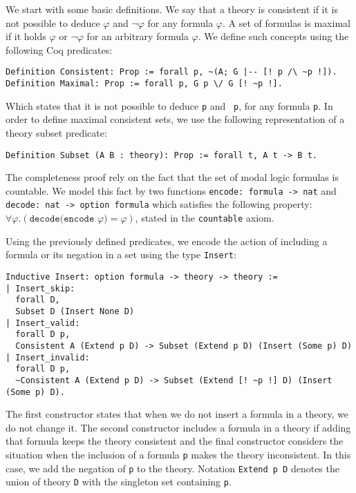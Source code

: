 \documentclass[3p,times]{elsarticle}
\begin{document}
We start with some basic definitions. We say that a theory is consistent if it is not possible to deduce
$\varphi$ and $\neg \varphi$ for any formula $\varphi$. A set of formulas is maximal if it holds $\varphi$ or $\neg \varphi$
for an arbitrary formula $\varphi$. We define such concepts using the following Coq predicates:

\begin{verbatim}
Definition Consistent: Prop := forall p, ~(A; G |-- [! p /\ ~p !]).
Definition Maximal: Prop := forall p, G p \/ G [! ~p !].
\end{verbatim}

Which states that it is not possible to deduce \texttt{p} and \texttt{~p}, for any formula \texttt{p}.
In order to define maximal consistent sets, we use the following representation of a theory
subset predicate:

\begin{verbatim}
Definition Subset (A B : theory): Prop := forall t, A t -> B t.
\end{verbatim}

The completeness proof rely on the fact that the set of modal logic formulas is countable. We model
this fact by two functions \texttt{encode: formula -> nat} and \texttt{decode: nat -> option formula}
which satisfies the following property: $\forall \varphi . (\texttt{decode(encode }\varphi\texttt{)} = \varphi)$, stated in the \texttt{countable} axiom.

Using the previously defined predicates, we encode the action of including a formula or its
negation in a set using the type \texttt{Insert}:

\begin{verbatim}
Inductive Insert: option formula -> theory -> theory :=
| Insert_skip:
  forall D,
  Subset D (Insert None D)
| Insert_valid:
  forall D p,
  Consistent A (Extend p D) -> Subset (Extend p D) (Insert (Some p) D)
| Insert_invalid:
  forall D p,
  ~Consistent A (Extend p D) -> Subset (Extend [! ~p !] D) (Insert (Some p) D).
\end{verbatim}

The first constructor states that when we do not insert a formula in a theory,
we do not change it. The second constructor includes a formula in a theory if
adding that formula keeps the theory consistent and the final constructor considers
the situation when the inclusion of a formula \verb|p| makes the theory inconsistent.
In this case, we add the negation of \verb|p| to the theory. Notation \texttt{Extend p D} denotes the union of theory \texttt{D} with the
singleton set containing \texttt{p}.
\end{document}
